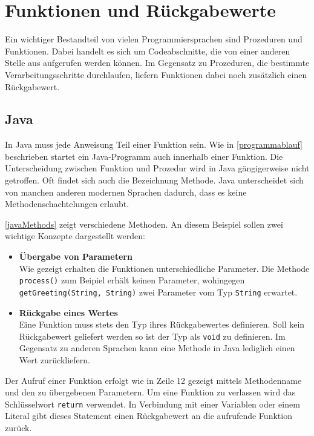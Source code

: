 \section{Funktionen und Rückgabewerte}\label{sec:functionsAndReturnValues}

Ein wichtiger Bestandteil von vielen Programmiersprachen sind Prozeduren und Funktionen. Dabei handelt es sich um Codeabschnitte, die von einer anderen Stelle aus aufgerufen werden können. Im Gegensatz zu Prozeduren, die bestimmte Verarbeitungsschritte durchlaufen, liefern Funktionen dabei noch zusätzlich einen Rückgabewert.\\

\subsection*{Java}
In Java muss jede Anweisung Teil einer Funktion sein. Wie in \autoref{programmablauf} beschrieben startet ein Java-Programm auch innerhalb einer Funktion. Die Unterscheidung zwischen Funktion und Prozedur wird in Java gängigerweise nicht getroffen. Oft findet sich auch die Bezeichnung Methode. Java unterscheidet sich von manchen anderen modernen Sprachen dadurch, dass es keine Methodenschachtelungen erlaubt.\\


\autoref{javaMethods} zeigt verschiedene Methoden. An diesem Beispiel sollen zwei wichtige Konzepte dargestellt werden: \\
\begin{itemize}
    \item \textbf{Übergabe von Parametern}\\
    Wie gezeigt erhalten die Funktionen unterschiedliche Parameter. Die Methode \texttt{process()} zum Beipiel erhält keinen Parameter, wohingegen \texttt{getGreeting(String, String)} zwei Parameter vom Typ \texttt{String} erwartet.
    \item \textbf{Rückgabe eines Wertes}\\
    Eine Funktion muss stets den Typ ihres Rückgabewertes definieren. Soll kein Rückgabewert geliefert werden so ist der Typ als \texttt{void} zu definieren. Im Gegensatz zu anderen Sprachen kann eine Methode in Java lediglich einen Wert zurückliefern.
\end{itemize}

Der Aufruf einer Funktion erfolgt wie in Zeile 12 gezeigt mittels Methodenname und den zu übergebenen Parametern. Um eine Funktion zu verlassen wird das Schlüsselwort \texttt{return} verwendet. In Verbindung mit einer Variablen oder einem Literal gibt dieses Statement einen Rückgabewert an die aufrufende Funktion zurück.\\

